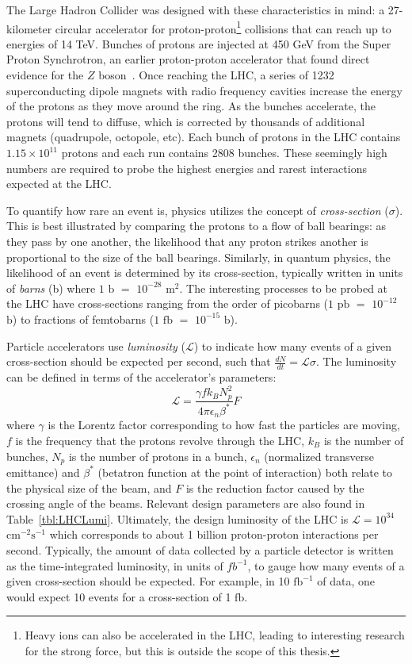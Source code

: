 The Large Hadron Collider was designed with these characteristics in mind: a 27-kilometer circular accelerator for proton-proton\footnote{Heavy ions can also be accelerated in the LHC, leading to interesting research for the strong force, but this is outside the scope of this thesis.} collisions that can reach up to energies of 14 TeV. Bunches of protons are injected at 450 GeV from the Super Proton Synchrotron, an earlier proton-proton accelerator that found direct evidence for the $Z$ boson~\cite{}. Once reaching the LHC, a series of 1232 superconducting dipole magnets with radio frequency cavities increase the energy of the protons as they move around the ring. As the bunches accelerate, the protons will tend to diffuse, which is corrected by thousands of additional magnets (quadrupole, octopole, etc). Each bunch of protons in the LHC contains $1.15\times10^{11}$ protons and each run contains 2808 bunches. These seemingly high numbers are required to probe the highest energies and rarest interactions expected at the LHC.

To quantify how rare an event is, physics utilizes the concept of \textit{cross-section} ($\sigma$). This is best illustrated by comparing the protons to a flow of ball bearings: as they pass by one another, the likelihood that any proton strikes another is proportional to the size of the ball bearings. Similarly, in quantum physics, the likelihood of an event is determined by its cross-section, typically written in units of \textit{barns} (b) where $1$ $\mathrm{b}$ $=$ $10^{-28}$ $\mathrm{m}^2$. The interesting processes to be probed at the LHC have cross-sections ranging from the order of picobarns ($1$ $\mathrm{pb}$ $=$ $10^{-12}$ $\mathrm{b}$) to fractions of femtobarns ($1$ $\mathrm{fb}$ $=$ $10^{-15}$ $\mathrm{b}$).

Particle accelerators use \textit{luminosity} ($\mathcal{L}$) to indicate how many events of a given cross-section should be expected per second, such that $\frac{dN}{dt}=\mathcal{L}\sigma$. The luminosity can be defined in terms of the accelerator's parameters:
\begin{equation*}
\mathcal{L} = \frac{\gamma f k_{B}N_p^2}{4\pi \epsilon_{n} \beta^{*}}F
\end{equation*}
where $\gamma$ is the Lorentz factor corresponding to how fast the particles are moving, $f$ is the frequency that the protons revolve through the LHC, $k_{B}$ is the number of bunches, $N_p$ is the number of protons in a bunch, $\epsilon_n$ (normalized transverse emittance) and $\beta^{*}$ (betatron function at the point of interaction) both relate to the physical size of the beam, and $F$ is the reduction factor caused by the crossing angle of the beams. Relevant design parameters are also found in Table~\ref{tbl:LHCLumi}. Ultimately, the design luminosity of the LHC is $\mathcal{L} = 10^{34}$ $\mathrm{cm}^{-2}\mathrm{s}^{-1}$ which corresponds to about 1 billion proton-proton interactions per second. Typically, the amount of data collected by a particle detector is written as the time-integrated luminosity, in units of $fb^{-1}$, to gauge how many events of a given cross-section should be expected. For example, in 10 $\mathrm{fb}^{-1}$ of data, one would expect 10 events for a cross-section of 1 $\mathrm{fb}$.

